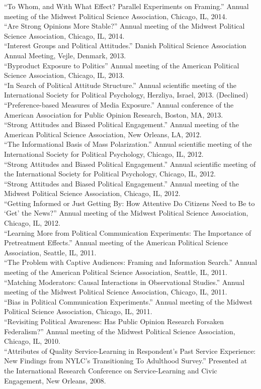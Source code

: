 \documentclass[12pt]{article}
\newcommand{\entry}[1]{\indent {\color{lg}\guillemotright}\hspace{2pt}#1\vspace{.25em}\\}
\begin{document}
\entry{``To Whom, and With What Effect? Parallel Experiments on Framing.'' Annual meeting of the Midwest Political Science Association, Chicago, IL, 2014.}
\entry{``Are Strong Opinions More Stable?'' Annual meeting of the Midwest Political Science Association, Chicago, IL, 2014.}
\entry{``Interest Groups and Political Attitudes.'' Danish Political Science Association Annual Meeting, Vejle, Denmark, 2013.}
\entry{``Byproduct Exposure to Politics'' Annual meeting of the American Political Science Association, Chicago, IL, 2013.}
\entry{``In Search of Political Attitude Structure.'' Annual scientific meeting of the International Society for Political Psychology, Herzliya, Israel, 2013. (Declined)}
\entry{``Preference-based Measures of Media Exposure.'' Annual conference of the American Association for Public Opinion Research, Boston, MA, 2013.}
\entry{``Strong Attitudes and Biased Political Engagement.'' Annual meeting of the American Political Science Association, New Orleans, LA, 2012.}
\entry{``The Informational Basis of Mass Polarization.'' Annual scientific meeting of the International Society for Political Psychology, Chicago, IL, 2012.}
\entry{``Strong Attitudes and Biased Political Engagement.'' Annual scientific meeting of the International Society for Political Psychology, Chicago, IL, 2012.}
\entry{``Strong Attitudes and Biased Political Engagement.'' Annual meeting of the Midwest Political Science Association, Chicago, IL, 2012.}
\entry{``Getting Informed or Just Getting By: How Attentive Do Citizens Need to Be to `Get' the News?'' Annual meeting of the Midwest Political Science Association, Chicago, IL, 2012.}
\entry{``Learning More from Political Communication Experiments: The Importance of Pretreatment Effects.'' Annual meeting of the American Political Science Association, Seattle, IL, 2011.}
\entry{``The Problem with Captive Audiences: Framing and Information Search.'' Annual meeting of the American Political Science Association, Seattle, IL, 2011.}
\entry{``Matching Moderators: Causal Interactions in Observational Studies.'' Annual meeting of the Midwest Political Science Association, Chicago, IL, 2011.}
\entry{``Bias in Political Communication Experiments.'' Annual meeting of the Midwest Political Science Association, Chicago, IL, 2011.}
\entry{``Revisiting Political Awareness: Has Public Opinion Research Forsaken Federalism?'' Annual meeting of the Midwest Political Science Association, Chicago, IL, 2010.}
\entry{``Attributes of Quality Service-Learning in Respondent's Past Service Experience: New Findings from NYLC's Transitioning To Adulthood Survey.'' Presented at the International Research Conference on Service-Learning and Civic Engagement, New Orleans, 2008.}
\end{document}
